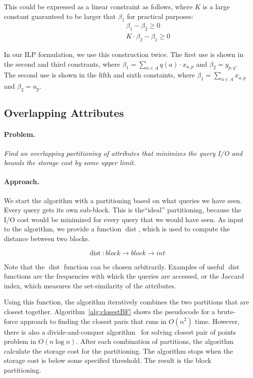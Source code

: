 \documentclass[twocolumn]{svjour3}          %
\DeclareMathOperator{\dist}{dist}
\begin{document}
This could be expressed as a linear constraint as follows,  where $K$ is a
large constant guaranteed to be larger  that $\beta_1$ for practical purposes:
\begin{eqnarray}
\hspace{2cm}&& \beta_1 - \beta_2 \geq 0\nonumber\\
\hspace{2cm}&& K\cdot\beta_2 - \beta_1 \geq 0\nonumber
\end{eqnarray}

In our ILP formulation, we use this construction twice. The first use is shown
in the second and third constrants, where $\beta_1=\sum_{a\in A} q(a)\cdot
x_{a,p}$ and $\beta_2=y_{p,q}$. The second use is shown in the fifth and 
sixth constaints, where $\beta_1=\sum_{a\in A} x_{a,p}$ and $\beta_2=u_p$.

\subsection{Overlapping Attributes}

\paragraph*{Problem.}\emph{Find an overlapping partitioning of attributes that minimizes
  the query I/O and bounds the storage cost by some upper limit.}

\paragraph*{Approach.} We start the algorithm with a 
 partitioning based on what queries we have seen.
Every query gets its own sub-block. This is the``ideal'' partitioning,
because the I/O cost would be minimized for every query that we would
have seen. As input to the algorithm, we provide a function $\dist$, which
is used to compute the distance between two blocks.

$$
\dist: block \rightarrow block \rightarrow int
$$

Note that the $\dist$ function can be chosen arbitrarily.  Examples of useful
$\dist$ functions are the frequencies with which the queries are accessed, or the Jaccard index, which measures the set-similarity of
the attributes.

Using this function, the algorithm iteratively combines the two partitions that
are closest together. Algorithm~\ref{alg:closestBF} shows the pseudocode for a brute-force approach
  to finding the closest paris that runs in $O(n^2)$ time. However, there is
  also a divide-and-conquer algorithm~\cite{cormen01} for solving closest pair
  of points problem in $O(n \log n)$.
After each combination of partitions, the algorithm calculate the storage cost
for the partitioning. The algorithm stops when the  storage cost is below some
specified threshold.  The result is the block partitioning.
\end{document}
